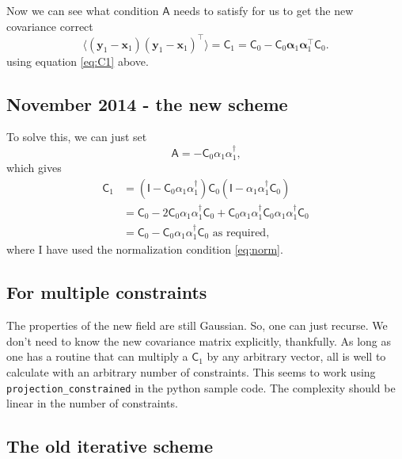 \documentclass[11pt,a4paper,preprint]{aastex}
\newcommand{\bmath}[1]{\ensuremath{\bm{#1}}}
\renewcommand{\vec}[1]{\bmath{#1}}
\begin{document}
Now we can see what condition $\mathsf{A}$ needs to satisfy for us to
get the new covariance correct
\begin{equation}
\langle (\vec{y}_1-\vec{x}_1) (\vec{y}_1-\vec{x}_1)^{\top} \rangle =
\mathsf{C}_1 =
\mathsf{C}_0 - \mathsf{C}_0 \vec{\alpha}_1 \vec{\alpha}_1^{\top} \mathsf{C}_0
\textrm{.}
\end{equation}
using equation \eqref{eq:C1} above.

\subsection{November 2014 - the new scheme}

To solve this, we can just set
\begin{equation}
\mathsf{A} = - \mathsf{C}_0 \alpha_1 \alpha_1^{\dagger}\textrm{,}
\end{equation}
which gives
\begin{align}
\mathsf{C}_1 & = (\mathsf{I} - \mathsf{C}_0 \alpha_1
\alpha_1^{\dagger}) \mathsf{C}_0  (\mathsf{I} - \alpha_1
\alpha_1^{\dagger} \mathsf{C}_0 ) \\
& = \mathsf{C}_0 - 2 \mathsf{C}_0 \alpha_1 \alpha_1^{\dagger}
\mathsf{C}_0 + \mathsf{C}_0 \alpha_1 \alpha_1^{\dagger}
\mathsf{C}_0 \alpha_1 \alpha_1^{\dagger}
\mathsf{C}_0  \\
& = \mathsf{C}_0 - \mathsf{C}_0 \alpha_1 \alpha_1^{\dagger}
\mathsf{C}_0\textrm{ as required,}
\end{align}
where I have used the normalization condition \eqref{eq:norm}.

\subsection{For multiple constraints}

The properties of the new field are still Gaussian. So, one can just
recurse. We don't need to know the new covariance matrix explicitly,
thankfully.  As long as one has a routine that can multiply a
$\mathsf{C}_1$ by any arbitrary vector, all is well to calculate with
an arbitrary number of constraints. This seems to work using
\texttt{projection\_constrained} in the python sample code. The
complexity should be linear in the number of constraints.

\subsection{The old iterative scheme}
\end{document}

